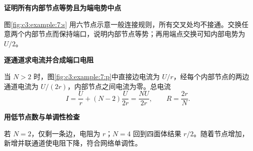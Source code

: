 \begin{solution}\textbf{证明所有内部节点等势且为端电势中点}\par\nobreak
图\ref{fig:c3:example:7:s} 用六节点示意一般连接规则，所有交叉处均不接通。交换任意两个内部节点而保持端口，说明内部节点等势；再用端点交换可知内部电势为 $U/2$。



\par\medskip{}\noindent\textbf{逐通道求电流并合成端口电阻}\par\nobreak
当 $N>2$ 时，图\ref{fig:c3:example:7:p}中直接边电流为 $U/r$，经每个内部节点的两边通道电流为 $U/(2r)$，内部节点之间电流为零。总电流
\[
 I=\frac Ur+(N-2)\frac{U}{2r}=\frac{NU}{2r},\qquad R=\frac{2r}{N}.
\]


\par\medskip{}\noindent\textbf{用低节点数与单调性检查}\par\nobreak
若 $N=2$，仅剩一条边，电阻为 $r$；$N=4$ 回到四面体结果 $r/2$。随着节点增加，新增并联通道使电阻下降，符合网络单调性。\end{solution}
